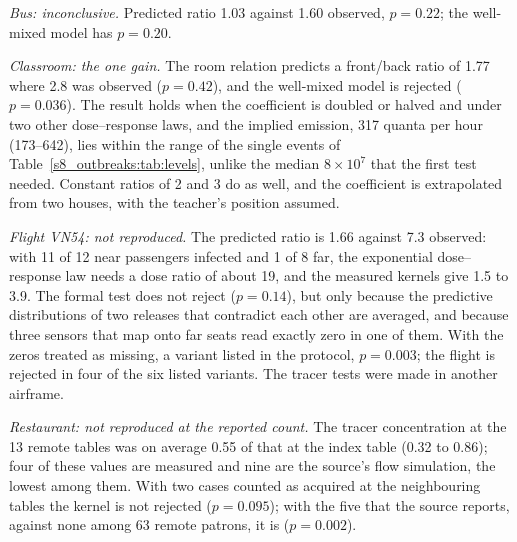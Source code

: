 \emph{Bus: inconclusive.} Predicted ratio 1.03 against 1.60 observed, $p=0.22$; the well-mixed model has
$p=0.20$.

\emph{Classroom: the one gain.} The room relation predicts a front/back ratio of 1.77 where 2.8 was observed
($p=0.42$), and the well-mixed model is rejected ($p=0.036$). The result holds when the coefficient is doubled
or halved and under two other dose--response laws, and the implied emission, 317 quanta per hour (173--642),
lies within the range of the single events of Table~\ref{s8_outbreaks:tab:levels}, unlike the median
$8\times10^{7}$ that the first test needed. Constant ratios of 2 and 3 do as well, and the coefficient is
extrapolated from two houses, with the teacher's position assumed.

\emph{Flight VN54: not reproduced.} The predicted ratio is 1.66 against 7.3 observed: with 11 of 12 near
passengers infected and 1 of 8 far, the exponential dose--response law needs a dose ratio of about 19, and the
measured kernels give 1.5 to 3.9. The formal test does not reject ($p=0.14$), but only because the predictive
distributions of two releases that contradict each other are averaged, and because three sensors that map onto
far seats read exactly zero in one of them. With the zeros treated as missing, a variant listed in the
protocol, $p=0.003$; the flight is rejected in four of the six listed variants. The tracer tests were made in
another airframe.

\emph{Restaurant: not reproduced at the reported count.} The tracer concentration at the 13 remote tables
was on average 0.55 of that at the index table (0.32 to 0.86); four of these values are measured and nine are
the source's flow simulation, the lowest among them. With two cases counted as acquired at the neighbouring tables
the kernel is not rejected ($p=0.095$); with the five that the source reports, against none among 63 remote
patrons, it is ($p=0.002$).

